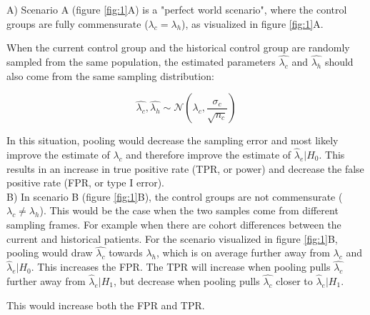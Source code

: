 \documentclass[Royal,sagev,times]{sagej}
\begin{document}
A) Scenario A (figure \ref{fig:1}A) is a "perfect world scenario", where the control groups are fully commensurate ($\lambda_{c} = \lambda_{h}$), as visualized in figure \ref{fig:1}A. 

When the current control group and the historical control group are randomly sampled from the same population, the estimated parameters $\hat{\lambda_{c}}$ and $\hat{\lambda_{h}}$ should also come from the same sampling distribution:

\begin{equation}
\hat{\lambda_{c}}, \hat{\lambda_{h}}  \sim \mathcal{N}(\lambda_{c}, \frac{\sigma_{c}}{\sqrt{n_{c}}}) \end{equation}

In this situation, pooling would decrease the sampling error and most likely improve the estimate of $\lambda_c$ and therefore improve the estimate of $\hat{\lambda}_e|H_0$. This results in an increase in true positive rate (TPR, or power) and decrease the false positive rate (FPR, or type I error).\\

B) In scenario B (figure \ref{fig:1}B), the control groups are not commensurate ($\lambda_{c} \neq \lambda_{h}$). This would be the case when the two samples come from different sampling frames. For example when there are cohort differences between the current and historical patients. For the scenario visualized in figure \ref{fig:1}B, pooling would draw $\hat{\lambda_c}$ towards $\lambda_{h}$, which is on average further away from $\lambda_{c}$ and $\hat{\lambda}_e|H_0$. This increases the FPR. The TPR will increase when pooling pulls $\hat{\lambda_c}$ further away from $\hat{\lambda}_e|H_1$, but decrease when pooling pulls $\hat{\lambda_c}$ closer to $\hat{\lambda}_e|H_1$.

This would increase both the FPR and TPR.\\
\end{document}
